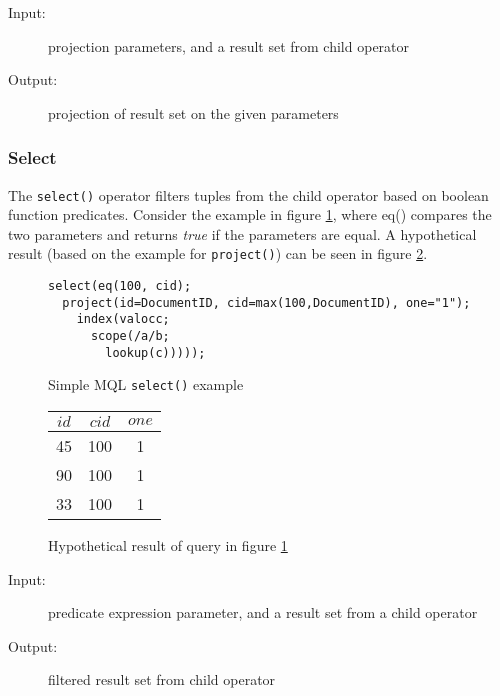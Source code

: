 \begin{description}
  \item[Input:] projection parameters, and a result set from child operator
  \item[Output:] projection of result set on the given parameters
\end{description}

\subsubsection{Select}
The \texttt{select()} operator filters tuples from the child operator based on
boolean function predicates. Consider the example in figure
\ref{figure:mql:select_example}, where eq() compares the two parameters and
returns \textit{true} if the parameters are equal. A hypothetical result (based
on the example for \texttt{project()}) can be seen in figure
\ref{figure:mql:select_example_result}.

\begin{figure}[!h]
\centering
\begin{Verbatim}
select(eq(100, cid);
  project(id=DocumentID, cid=max(100,DocumentID), one="1");
    index(valocc;
      scope(/a/b;
        lookup(c)))));
\end{Verbatim}
\caption{Simple MQL \texttt{select()} example}
\label{figure:mql:select_example}
\end{figure}

\begin{figure}[!h]
\centering
\begin{tabular}{|c | c | c |}
\hline
$id$ & $cid$ & $one$ \\ \hline
45 & 100 & 1 \\ \hline
90 & 100 & 1 \\ \hline
33 & 100 & 1 \\ \hline
\end{tabular}
\caption{Hypothetical result of query in figure
\ref{figure:mql:select_example}}
\label{figure:mql:select_example_result}
\end{figure}

\begin{description}
  \item[Input:] predicate expression parameter, and a result set from a child
operator
  \item[Output:] filtered result set from child operator 
\end{description}

